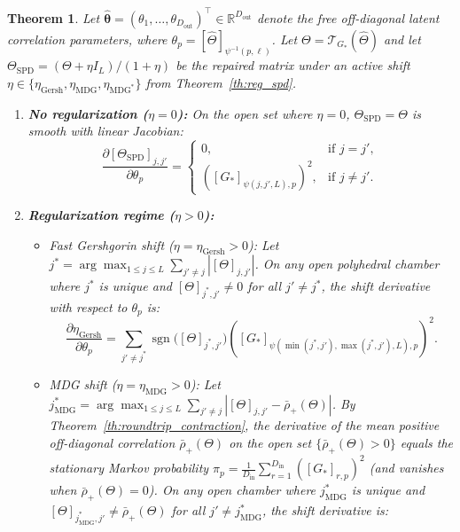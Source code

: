\documentclass[default,sn-mathphys,Numbered]{sn-jnl}
\theoremstyle{thmstyleone}
\newtheorem{theorem}{Theorem}
\theoremstyle{thmstylethree}
\theoremstyle{thmstyletwo}
\newcommand{\inp}{\text{in}}
\newcommand{\outp}{\text{out}}
\begin{document}
\begin{theorem}
\label{th:gershgorin_gradient}\label{thm:jacobian}
Let $\hat{\bm{\theta}} = (\theta_1, \ldots, \theta_{D_{\outp}})^\top \in \mathbb{R}^{D_{\outp}}$ denote the free off-diagonal latent correlation parameters, where $\theta_p = [\hat{\Theta}]_{\psi^{-1}(p, \ell)}$. Let $\Theta = \mathcal{T}_{G_*}(\hat{\Theta})$ and let $\Theta_{\mathrm{SPD}} = (\Theta + \eta I_L)/(1 + \eta)$ be the repaired matrix under an active shift $\eta \in \{\eta_{\mathrm{Gersh}}, \eta_{\mathrm{MDG}}, \eta_{\mathrm{MDG}^*}\}$ from Theorem~\ref{th:reg_spd}.
\begin{enumerate}
    \item[(a)] \textbf{No regularization ($\eta = 0$):} On the open set where $\eta = 0$, $\Theta_{\mathrm{SPD}} = \Theta$ is smooth with linear Jacobian:
    \begin{equation}
    \label{eq:grad_inactive}
    \frac{\partial [\Theta_{\mathrm{SPD}}]_{j, j'}}{\partial \theta_p} =
    \begin{cases}
    0, & \text{if } j = j', \\
    \left( [G_*]_{\psi(j,j',L), p} \right)^2, & \text{if } j \neq j'.
    \end{cases}
    \end{equation}
    \item[(b)] \textbf{Regularization regime ($\eta > 0$):}
    \begin{itemize}
        \item \emph{Fast Gershgorin shift ($\eta = \eta_{\mathrm{Gersh}} > 0$):} Let $j^* = \arg\max_{1 \le j \le L} \sum_{j' \neq j} |[\Theta]_{j, j'}|$. On any open polyhedral chamber where $j^*$ is unique and $[\Theta]_{j^*, j'} \neq 0$ for all $j' \neq j^*$, the shift derivative with respect to $\theta_p$ is:
        \begin{equation}
        \label{eq:eta_gradient}
        \frac{\partial \eta_{\mathrm{Gersh}}}{\partial \theta_p} = \sum_{j' \neq j^*} \operatorname{sgn}\bigl([\Theta]_{j^*, j'}\bigr) \left( [G_*]_{\psi(\min(j^*, j'), \max(j^*, j'), L), p} \right)^2.
        \end{equation}
        \item \emph{MDG shift ($\eta = \eta_{\mathrm{MDG}} > 0$):} Let $j_{\mathrm{MDG}}^* = \arg\max_{1 \le j \le L} \sum_{j' \neq j} |[\Theta]_{j, j'} - \bar{\rho}_+(\Theta)|$. By Theorem~\ref{th:roundtrip_contraction}, the derivative of the mean positive off-diagonal correlation $\bar{\rho}_+(\Theta)$ on the open set $\{\bar{\rho}_+(\Theta) > 0\}$ equals the stationary Markov probability $\pi_p = \frac{1}{D_{\inp}}\sum_{r=1}^{D_{\inp}} ([G_*]_{r, p})^2$ (and vanishes when $\bar{\rho}_+(\Theta) = 0$). On any open chamber where $j_{\mathrm{MDG}}^*$ is unique and $[\Theta]_{j_{\mathrm{MDG}}^*, j'} \neq \bar{\rho}_+(\Theta)$ for all $j' \neq j_{\mathrm{MDG}}^*$, the shift derivative is:

\end{itemize}
\end{enumerate}
\end{theorem}
\end{document}
